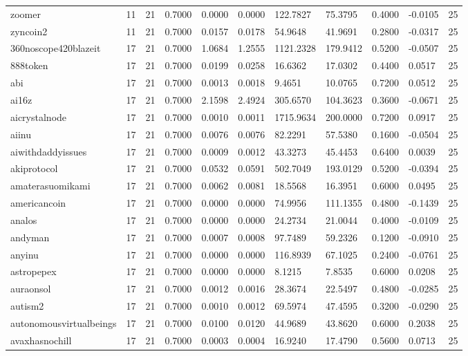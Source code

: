 \begin{table}[htbp]
\begin{tabular}{lllllllllll}
zoomer & 11 & 21 & 0.7000 & 0.0000 & 0.0000 & 122.7827 & 75.3795 & 0.4000 & -0.0105 & 25 \\
zyncoin2 & 11 & 21 & 0.7000 & 0.0157 & 0.0178 & 54.9648 & 41.9691 & 0.2800 & -0.0317 & 25 \\
360noscope420blazeit & 17 & 21 & 0.7000 & 1.0684 & 1.2555 & 1121.2328 & 179.9412 & 0.5200 & -0.0507 & 25 \\
888token & 17 & 21 & 0.7000 & 0.0199 & 0.0258 & 16.6362 & 17.0302 & 0.4400 & 0.0517 & 25 \\
abi & 17 & 21 & 0.7000 & 0.0013 & 0.0018 & 9.4651 & 10.0765 & 0.7200 & 0.0512 & 25 \\
ai16z & 17 & 21 & 0.7000 & 2.1598 & 2.4924 & 305.6570 & 104.3623 & 0.3600 & -0.0671 & 25 \\
aicrystalnode & 17 & 21 & 0.7000 & 0.0010 & 0.0011 & 1715.9634 & 200.0000 & 0.7200 & 0.0917 & 25 \\
aiinu & 17 & 21 & 0.7000 & 0.0076 & 0.0076 & 82.2291 & 57.5380 & 0.1600 & -0.0504 & 25 \\
aiwithdaddyissues & 17 & 21 & 0.7000 & 0.0009 & 0.0012 & 43.3273 & 45.4453 & 0.6400 & 0.0039 & 25 \\
akiprotocol & 17 & 21 & 0.7000 & 0.0532 & 0.0591 & 502.7049 & 193.0129 & 0.5200 & -0.0394 & 25 \\
amaterasuomikami & 17 & 21 & 0.7000 & 0.0062 & 0.0081 & 18.5568 & 16.3951 & 0.6000 & 0.0495 & 25 \\
americancoin & 17 & 21 & 0.7000 & 0.0000 & 0.0000 & 74.9956 & 111.1355 & 0.4800 & -0.1439 & 25 \\
analos & 17 & 21 & 0.7000 & 0.0000 & 0.0000 & 24.2734 & 21.0044 & 0.4000 & -0.0109 & 25 \\
andyman & 17 & 21 & 0.7000 & 0.0007 & 0.0008 & 97.7489 & 59.2326 & 0.1200 & -0.0910 & 25 \\
anyinu & 17 & 21 & 0.7000 & 0.0000 & 0.0000 & 116.8939 & 67.1025 & 0.2400 & -0.0761 & 25 \\
astropepex & 17 & 21 & 0.7000 & 0.0000 & 0.0000 & 8.1215 & 7.8535 & 0.6000 & 0.0208 & 25 \\
auraonsol & 17 & 21 & 0.7000 & 0.0012 & 0.0016 & 28.3674 & 22.5497 & 0.4800 & -0.0285 & 25 \\
autism2 & 17 & 21 & 0.7000 & 0.0010 & 0.0012 & 69.5974 & 47.4595 & 0.3200 & -0.0290 & 25 \\
autonomousvirtualbeings & 17 & 21 & 0.7000 & 0.0100 & 0.0120 & 44.9689 & 43.8620 & 0.6000 & 0.2038 & 25 \\
avaxhasnochill & 17 & 21 & 0.7000 & 0.0003 & 0.0004 & 16.9240 & 17.4790 & 0.5600 & 0.0713 & 25 \\

\end{tabular}
\end{table}
